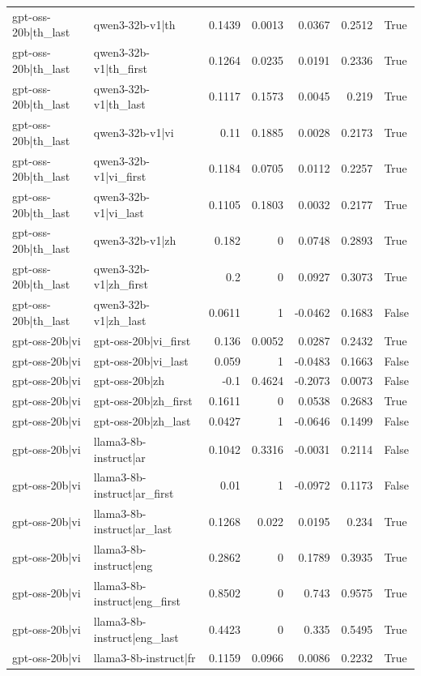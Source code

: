 \begin{table}
\begin{tabular}{l l r r r r l}
gpt-oss-20b|th_last & qwen3-32b-v1|th & 0.1439 & 0.0013 & 0.0367 & 0.2512 & True \\
gpt-oss-20b|th_last & qwen3-32b-v1|th_first & 0.1264 & 0.0235 & 0.0191 & 0.2336 & True \\
gpt-oss-20b|th_last & qwen3-32b-v1|th_last & 0.1117 & 0.1573 & 0.0045 & 0.219 & True \\
gpt-oss-20b|th_last & qwen3-32b-v1|vi & 0.11 & 0.1885 & 0.0028 & 0.2173 & True \\
gpt-oss-20b|th_last & qwen3-32b-v1|vi_first & 0.1184 & 0.0705 & 0.0112 & 0.2257 & True \\
gpt-oss-20b|th_last & qwen3-32b-v1|vi_last & 0.1105 & 0.1803 & 0.0032 & 0.2177 & True \\
gpt-oss-20b|th_last & qwen3-32b-v1|zh & 0.182 & 0 & 0.0748 & 0.2893 & True \\
gpt-oss-20b|th_last & qwen3-32b-v1|zh_first & 0.2 & 0 & 0.0927 & 0.3073 & True \\
gpt-oss-20b|th_last & qwen3-32b-v1|zh_last & 0.0611 & 1 & -0.0462 & 0.1683 & False \\
gpt-oss-20b|vi & gpt-oss-20b|vi_first & 0.136 & 0.0052 & 0.0287 & 0.2432 & True \\
gpt-oss-20b|vi & gpt-oss-20b|vi_last & 0.059 & 1 & -0.0483 & 0.1663 & False \\
gpt-oss-20b|vi & gpt-oss-20b|zh & -0.1 & 0.4624 & -0.2073 & 0.0073 & False \\
gpt-oss-20b|vi & gpt-oss-20b|zh_first & 0.1611 & 0 & 0.0538 & 0.2683 & True \\
gpt-oss-20b|vi & gpt-oss-20b|zh_last & 0.0427 & 1 & -0.0646 & 0.1499 & False \\
gpt-oss-20b|vi & llama3-8b-instruct|ar & 0.1042 & 0.3316 & -0.0031 & 0.2114 & False \\
gpt-oss-20b|vi & llama3-8b-instruct|ar_first & 0.01 & 1 & -0.0972 & 0.1173 & False \\
gpt-oss-20b|vi & llama3-8b-instruct|ar_last & 0.1268 & 0.022 & 0.0195 & 0.234 & True \\
gpt-oss-20b|vi & llama3-8b-instruct|eng & 0.2862 & 0 & 0.1789 & 0.3935 & True \\
gpt-oss-20b|vi & llama3-8b-instruct|eng_first & 0.8502 & 0 & 0.743 & 0.9575 & True \\
gpt-oss-20b|vi & llama3-8b-instruct|eng_last & 0.4423 & 0 & 0.335 & 0.5495 & True \\
gpt-oss-20b|vi & llama3-8b-instruct|fr & 0.1159 & 0.0966 & 0.0086 & 0.2232 & True \\

\end{tabular}
\end{table}
